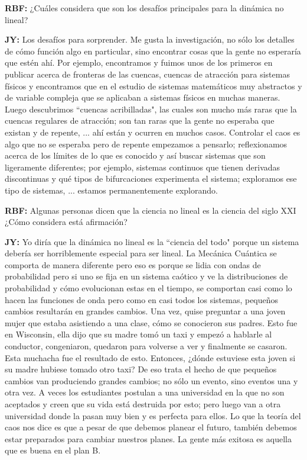 \documentclass{rbf}
\newcommand{\mr}{{\bf RBF: }}
\newcommand{\jim}{{\bf JY: }}
\begin{document}
\mr ¿Cuáles considera que son los desafíos principales para la dinámica no lineal?

\jim Los desafíos para sorprender. Me gusta la investigación, no sólo los detalles de cómo función algo en particular, sino encontrar cosas que la gente no esperaría que estén ahí. Por ejemplo, encontramos y fuimos unos de los primeros en publicar acerca de fronteras de las cuencas, cuencas de atracción para sistemas físicos y encontramos que en el estudio de sistemas matemáticos muy abstractos y de variable compleja que se aplicaban a sistemas físicos en muchas maneras. Luego descubrimos ``cuencas acribilladas", las cuales son mucho más raras que la cuencas regulares de atracción; son tan raras que la gente no esperaba que existan y de repente, ... ahí están y ocurren en muchos casos. Controlar el caos es algo que no se esperaba pero de repente empezamos a pensarlo; reflexionamos acerca de los límites de lo que es conocido y así buscar sistemas que son ligeramente diferentes; por ejemplo, sistemas continuos que tienen derivadas discontinuas
y qué tipos de bifurcaciones experimenta el sistema; exploramos ese tipo de sistemas, ... estamos permanentemente explorando.

\mr Algunas personas dicen que la ciencia no lineal es la ciencia del siglo XXI ¿Cómo considera está afirmación?

\jim Yo diría que la dinámica no lineal es la ``ciencia del todo" porque un sistema debería ser horriblemente especial para ser lineal. La Mecánica Cuántica se comporta de manera diferente pero eso es porque se lidia con ondas de probabilidad pero si uno se fija en un sistema caótico y ve la distribuciones de probabilidad y cómo evolucionan estas en el tiempo, se comportan casi como lo hacen las funciones de onda pero como en casi todos los sistemas, pequeños cambios resultarán en grandes cambios. Una vez, quise preguntar a una joven mujer
que estaba asistiendo a una clase, cómo se conocieron sus padres. Esto fue en Wisconsin, ella dijo que su madre tomó un taxi y empezó a hablarle al conductor, congeniaron, quedaron para volverse a ver y finalmente se casaron. Esta muchacha fue el resultado de esto. Entonces, ¿dónde estuviese esta joven si su madre hubiese tomado otro taxi? De eso trata el hecho de que pequeños cambios van produciendo grandes cambios; no sólo un evento, sino eventos una y otra vez. A veces los estudiantes postulan a una universidad en la que no son aceptados y creen que su vida está destruida por esto; pero luego van a otra universidad donde la pasan muy bien y es perfecta para ellos. Lo que la teoría del caos nos dice es que a pesar de que debemos planear el futuro, también debemos estar preparados para cambiar nuestros planes. La gente más exitosa es aquella que es buena en el plan B.
\end{document}
